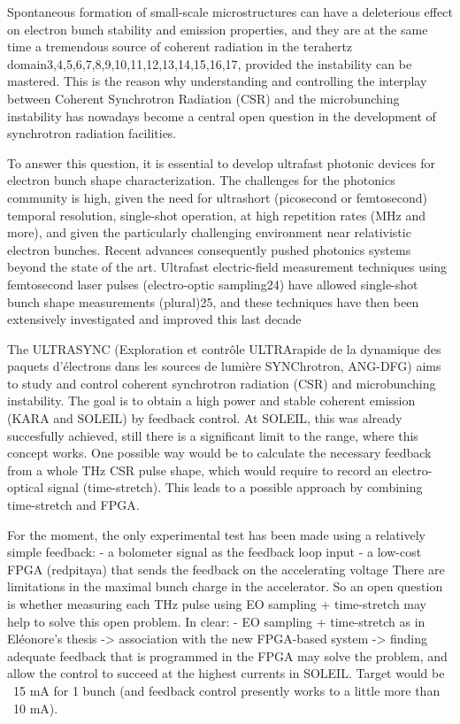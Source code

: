 Spontaneous formation of small-scale microstructures can have a deleterious effect on electron bunch stability and emission properties, and they are at the same time a tremendous source of coherent radiation in the terahertz domain3,4,5,6,7,8,9,10,11,12,13,14,15,16,17, provided the instability can be mastered. This is the reason why understanding and controlling the interplay between Coherent Synchrotron Radiation (CSR) and the microbunching instability has nowadays become a central open question in the development of synchrotron radiation facilities.

To answer this question, it is essential to develop ultrafast photonic devices for electron bunch shape characterization. The challenges for the photonics community is high, given the need for ultrashort (picosecond or femtosecond) temporal resolution, single-shot operation, at high repetition rates (MHz and more), and given the particularly challenging environment near relativistic electron bunches. Recent advances consequently pushed photonics systems beyond the state of the art. Ultrafast electric-field measurement techniques using femtosecond laser pulses (electro-optic sampling24) have allowed single-shot bunch shape measurements (plural)25, and these techniques have then been extensively investigated and improved this last decade


The ULTRASYNC (Exploration et contrôle ULTRArapide de la dynamique des paquets d'électrons dans les sources de lumière SYNChrotron, ANG-DFG) aims to study and control coherent synchrotron radiation (CSR) and microbunching instability. The goal is to obtain a high power and stable coherent emission (KARA and SOLEIL) by feedback control. At SOLEIL, this was already succesfully achieved, still there is a significant limit to the range, where this concept works. One possible way would be to calculate the necessary feedback from a whole THz CSR pulse shape, which would require to record an electro-optical signal (time-stretch). This leads to a possible approach by combining time-stretch and FPGA. 

For the moment, the only experimental test has been made using a relatively simple feedback:
- a bolometer signal as the feedback loop input
- a low-cost FPGA (redpitaya) that sends the feedback on the accelerating voltage
There are limitations in the maximal bunch charge in the accelerator. So an open question is whether measuring each THz pulse using EO sampling + time-stretch may help to solve this open problem. In clear:
- EO sampling + time-stretch as in Eléonore's thesis
-> association with the new FPGA-based system
-> finding adequate feedback that is programmed in the FPGA
may solve the problem, and allow the control to succeed at the highest currents in SOLEIL. 
Target would be ~15 mA for 1 bunch (and feedback control presently works to a little more than ~10 mA).


